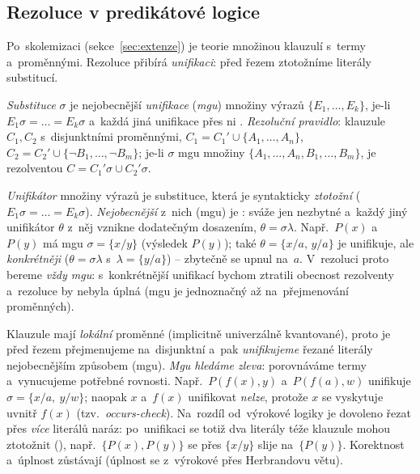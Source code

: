 \documentclass[11pt,a4paper]{article}
\begin{document}
\subsection{Rezoluce v predikátové logice}

Po~skolemizaci (sekce~\ref{sec:extenze}) je teorie množinou klauzulí s~termy a~proměnnými. Rezoluce přibírá \emph{unifikaci}: před řezem ztotožníme literály substitucí.

\begin{definice}
\emph{Substituce} $\sigma$ je nejobecnější \emph{unifikace} (\emph{mgu}) množiny výrazů $\{E_1,\dots,E_k\}$, je-li $E_1\sigma=\dots=E_k\sigma$ a~každá jiná unifikace přes ni . \emph{Rezoluční pravidlo}: klauzule $C_1,C_2$ s~disjunktními proměnnými, $C_1=C_1'\cup\{A_1,\dots,A_n\}$, $C_2=C_2'\cup\{\neg B_1,\dots,\neg B_m\}$; je-li $\sigma$ mgu množiny $\{A_1,\dots,A_n,B_1,\dots,B_m\}$, je rezolventou $C=C_1'\sigma\cup C_2'\sigma$.
\end{definice}

\begin{intuice}
\emph{Unifikátor} množiny výrazů je substituce, která je syntakticky \emph{ztotožní} ($E_1\sigma=\dots=E_k\sigma$). \emph{Nejobecnější} z~nich (mgu) je : sváže jen nezbytné a~každý jiný unifikátor $\theta$ z~něj vznikne dodatečným dosazením, $\theta=\sigma\lambda$. Např.\ $P(x)$ a~$P(y)$ má mgu $\sigma=\{x/y\}$ (výsledek $P(y)$); také $\theta=\{x/a,\,y/a\}$ je unifikuje, ale \emph{konkrétněji} ($\theta=\sigma\lambda$ s~$\lambda=\{y/a\}$) -- zbytečně se upnul na~$a$. V~rezoluci proto bereme \emph{vždy mgu}: s~konkrétnější unifikací bychom ztratili obecnost rezolventy a~rezoluce by nebyla úplná (mgu je jednoznačný až na~přejmenování proměnných).\par
Klauzule mají \emph{lokální} proměnné (implicitně univerzálně kvantované), proto je před řezem přejmenujeme na~disjunktní a~pak \emph{unifikujeme} řezané literály nejobecnějším způsobem (mgu). \emph{Mgu hledáme zleva}: porovnáváme termy a~vynucujeme potřebné rovnosti. Např.\ $P(f(x),y)$ a~$P(f(a),w)$ unifikuje $\sigma=\{x/a,\ y/w\}$; naopak $x$ a~$f(x)$ unifikovat \emph{nelze}, protože $x$ se vyskytuje uvnitř $f(x)$ (tzv.\ \emph{occurs-check}). Na~rozdíl od~výrokové logiky je dovoleno řezat přes \emph{více} literálů naráz: po~unifikaci se totiž dva literály téže klauzule mohou ztotožnit (), např.\ $\{P(x),P(y)\}$ se přes $\{x/y\}$ slije na~$\{P(y)\}$. Korektnost a~úplnost zůstávají (úplnost se  z~výrokové přes Herbrandovu větu).
\end{intuice}
\end{document}

